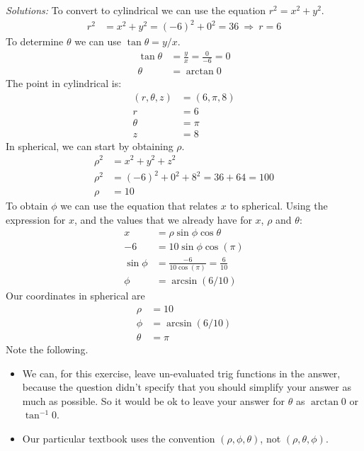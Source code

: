     \ifnum {} {\color{DarkBlue} \textit{Solutions:} To convert to cylindrical we can use the equation $r^2 = x^2 + y^2$. 
    \begin{align}
        r^2 &= x^2 + y^2 = (-6)^2 + 0^2 = 36 \ \Rightarrow \ r = 6
    \end{align}
    To determine $\theta$ we can use $\tan\theta = y/x$. 
    \begin{align}
        \tan \theta &= \frac{y}{x} = \frac{0}{-6} = 0  \\
        \theta &= \arctan 0 
    \end{align} 
    The point in cylindrical is: 
    \begin{align}
        (r,\theta,z) &= (6,\pi,8) \\
        r &= 6 \\
        \theta &= \pi \\
        z &= 8
    \end{align}
    In spherical, we can start by obtaining $\rho$. 
    \begin{align}
        \rho^2 &= x^2+y^2+z^2\\
        \rho^2 &= (-6)^2 + 0^2 + 8^2 = 36+64 = 100 \\
        \rho &= 10
    \end{align}
    To obtain $\phi$ we can use the equation that relates $x$ to spherical. Using the expression for $x$, and the values that we already have for $x$, $\rho$ and $\theta$:
    \begin{align}
        x &= \rho \sin\phi \cos\theta \\
        -6 &= 10\sin\phi \cos(\pi) \\
        \sin\phi &= \frac{-6}{10 \cos(\pi)}  = \frac{6}{10}\\
        \phi &= \arcsin (6/10)
    \end{align}
    Our coordinates in spherical are
    \begin{align}
        \rho &= 10\\
        \phi &= \arcsin (6/10)\\
        \theta &= \pi
    \end{align}
    Note the following.
    \begin{itemize}
        \item We can, for this exercise, leave un-evaluated trig functions in the answer, because the question didn't specify that you should simplify your answer as much as possible. So it would be ok to leave your answer for $\theta$ as $\arctan 0$ or $\tan^{-1} 0$. 
        \item Our particular textbook uses the convention $(\rho, \phi, \theta)$, not $(\rho, \theta,\phi)$.
    \end{itemize}
    } 
    \else
      
